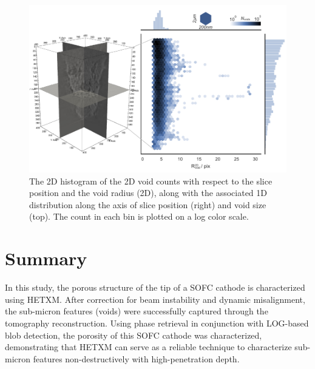\documentclass[12pt]{scrartcl}
\newcommand{\myscale}{1}
\begin{document}
\renewcommand{\myscale}{1.0}
\begin{figure}[htp]
\centering
\includegraphics[scale=\myscale]{void_profile}
\caption{
The 2D histogram of the 2D void counts with respect to the slice position and the void radius (2D), along with the associated 1D distribution along the axis of slice position (right) and void size (top). 
The count in each bin is plotted on a log color scale.
}\label{fig: void profile}
\end{figure}


\section{Summary}\label{sec: summary}

In this study, the porous structure of the tip of a SOFC cathode is characterized using HETXM.
After correction for beam instability and dynamic misalignment, the sub-micron features (voids) were successfully captured through the tomography reconstruction.
Using phase retrieval in conjunction with LOG-based blob detection, the porosity of this SOFC cathode was characterized, demonstrating that HETXM can serve as a reliable technique to characterize sub-micron features non-destructively with high-penetration depth. 



\end{document}
